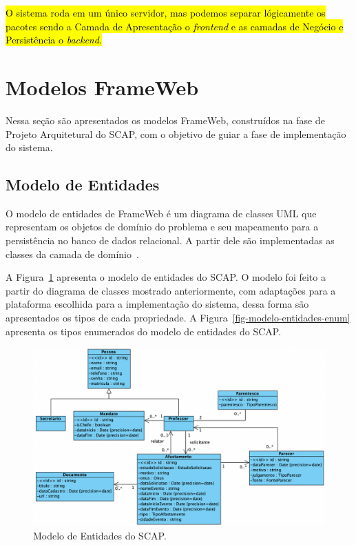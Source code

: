 \hl{O sistema roda em um único servidor, mas podemos separar lógicamente os pacotes sendo a Camada de Apresentação
o \textit{frontend} e as camadas de Negócio e Persistência o \textit{backend}.}


\section{Modelos FrameWeb}
\label{sec-projeto-frameweb}

Nessa seção são apresentados os modelos FrameWeb, construídos na fase de Projeto Arquitetural
do SCAP, com o objetivo de guiar a fase de implementação do sistema.

\subsection{Modelo de Entidades}
\label{subsec-frameweb-entidades}
O modelo de entidades de FrameWeb é um diagrama de classes UML que representam
os objetos de domínio do problema e seu mapeamento para a persistência no banco de dados
relacional. A partir dele são implementadas as classes da camada de domínio~\cite{souza:2007}.

A Figura~\ref{fig-modelo-entidades} apresenta o modelo de entidades do SCAP. O modelo foi feito
a partir do diagrama de classes mostrado anteriormente, com adaptações para a plataforma 
escolhida para a implementação do sistema, dessa forma são apresentados os tipos
de cada propriedade. A Figura~\ref{fig-modelo-entidades-enum} apresenta
os tipos enumerados do modelo de entidades do SCAP.

\begin{figure}
    \centering
    \includegraphics[width=1\textwidth]{figuras/fig-modelo-entidades.png}
    \caption{Modelo de Entidades do SCAP.}
    \label{fig-modelo-entidades}
\end{figure}

